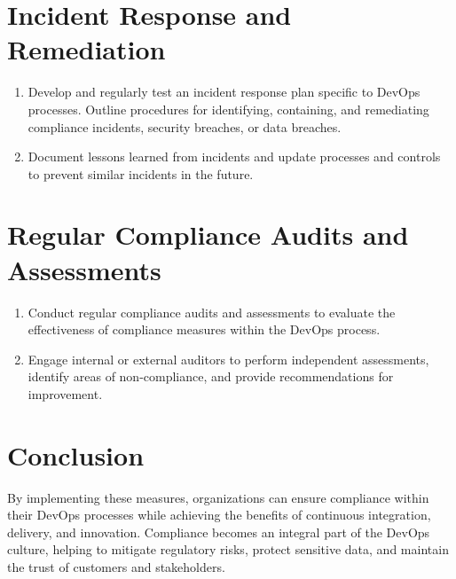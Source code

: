 \section*{Incident Response and Remediation}
\begin{enumerate}
    \item Develop and regularly test an incident response plan specific to DevOps processes. Outline procedures for identifying, containing, and remediating compliance incidents, security breaches, or data breaches.

    \item Document lessons learned from incidents and update processes and controls to prevent similar incidents in the future.
\end{enumerate}

\section*{Regular Compliance Audits and Assessments}
\begin{enumerate}
    \item Conduct regular compliance audits and assessments to evaluate the effectiveness of compliance measures within the DevOps process.

    \item Engage internal or external auditors to perform independent assessments, identify areas of non-compliance, and provide recommendations for improvement.
\end{enumerate}


\section*{Conclusion}
By implementing these measures, organizations can ensure compliance within their DevOps processes while achieving the benefits of continuous integration, delivery, and innovation. Compliance becomes an integral part of the DevOps culture, helping to mitigate regulatory risks, protect sensitive data, and maintain the trust of customers and stakeholders.